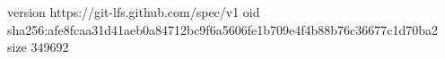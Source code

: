 version https://git-lfs.github.com/spec/v1
oid sha256:afe8fcaa31d41aeb0a84712bc9f6a5606fe1b709e4f4b88b76c36677c1d70ba2
size 349692
